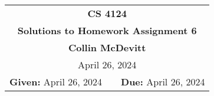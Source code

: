 \documentclass[11pt,twoside]{article}
\newcommand{\coursenumber}{CS 4124}
\newcommand{\docdate}{April 10, 2024}
\newcommand{\duedate}{April 26, 2024}
\newcommand{\homeworknumber}{6}
\newcommand{\doctitle}{Solutions to Homework Assignment \homeworknumber}
\newcommand{\doctitle}{Homework Assignment \homeworknumber}
\renewcommand{\docdate}{\duedate}
\renewcommand{\author}{Collin McDevitt}
\begin{document}
\thispagestyle{empty}

\begin{center}
\begin{tabular}{lcr}
\multicolumn{3}{c}{\Large\textbf{\coursenumber}}
\\[0.04in]
\multicolumn{3}{c}{\Large\textbf{\doctitle}}
\ifthenelse{\boolean{solutions}}{%
\\[0.04in]\multicolumn{3}{c}{\large\textbf{\author}}
}{} %
\ifthenelse{\boolean{solutions}}{%
\\[0.10in]\multicolumn{3}{c}{\duedate}
}{%
\\[0.10in]
\textbf{Given:} \docdate
& \hspace*{1.0in} &
\textbf{Due:} \duedate
}
\end{tabular}
\end{center}
\end{document}
